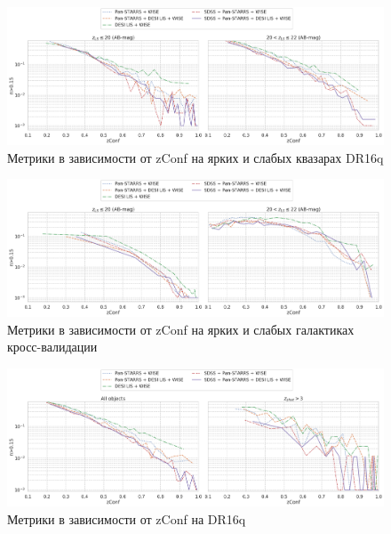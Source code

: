 \documentclass[fleqn,usenatbib]{mnras}
\begin{document}
\begin{figure}
    \centering
    \includegraphics[width=0.99\linewidth]{images/metrics-by-zconf-dr16q-qso-by-z-mag}
    \caption{Метрики в зависимости от zConf на ярких и слабых квазарах DR16q}
    \label{fig:metrics-zconf-cv2}
\end{figure}

\begin{figure}
    \centering
    \includegraphics[width=0.99\linewidth]{images/metrics-by-zconf-cv2-gal-by-z-mag}
    \caption{Метрики в зависимости от zConf на ярких и слабых галактиках кросс-валидации}
    \label{fig:metrics-zconf-cv2}
\end{figure}

\begin{figure}
    \centering
    \includegraphics[width=0.99\linewidth]{images/metrics-by-zconf-dr16q.png}
    \caption{Метрики в зависимости от zConf на DR16q}
    \label{fig:metrics-zconf-cv2}
\end{figure}
\end{document}
